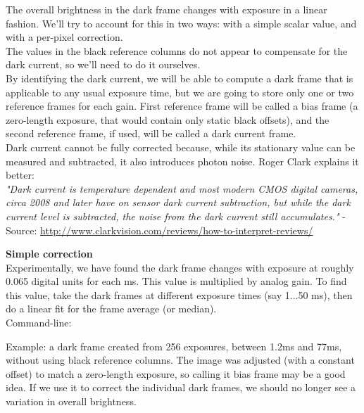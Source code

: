 The overall brightness in the dark frame changes with exposure in a linear fashion. We'll try to account for this in two ways: with a simple scalar value, and with a per-pixel correction.\\

The values in the black reference columns do not appear to compensate for the dark current, so we'll need to do it ourselves.\\

By identifying the dark current, we will be able to compute a dark frame that is applicable to any usual exposure time, but we are going to store only one or two reference frames for each gain. First reference frame will be called a bias frame (a zero-length exposure, that would contain only static black offsets), and the second reference frame, if used, will be called a dark current frame.\\

Dark current cannot be fully corrected because, while its stationary value can be measured and subtracted, it also introduces photon noise. Roger Clark explains it better:\\ 

\textit{"Dark current is temperature dependent and most modern CMOS digital cameras, circa 2008 and later have on sensor dark current subtraction, but while the dark current level is subtracted, the noise from the dark current still accumulates."} - Source: \href{http://www.clarkvision.com/reviews/how-to-interpret-reviews/}{http://www.clarkvision.com/reviews/how-to-interpret-reviews/}

\textbf{Simple correction}\\

Experimentally, we have found the dark frame changes with exposure at roughly 0.065 digital units for each ms. This value is multiplied by analog gain. To find this value, take the dark frames at different exposure times (say 1...50 ms), then do a linear fit for the frame average (or median).\\

Command-line:


Example: a dark frame created from 256 exposures, between 1.2ms and 77ms, without using black reference columns. The image was adjusted (with a constant offset) to match a zero-length exposure, so calling it bias frame may be a good idea. If we use it to correct the individual dark frames, we should no longer see a variation in overall brightness. 

